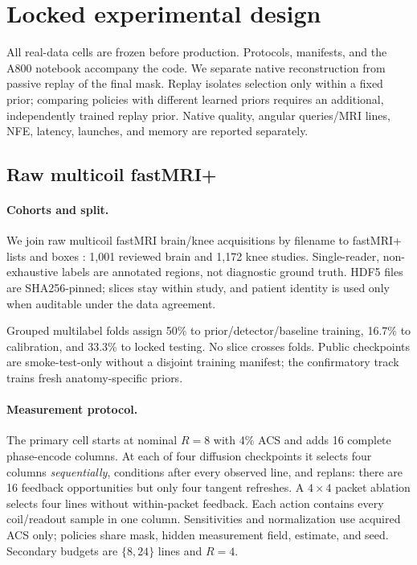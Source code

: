 \section{Locked experimental design}
\label{sec:experiments}

All real-data cells are frozen before production.  Protocols, manifests, and
the A800 notebook accompany the code.  We separate native reconstruction from
passive replay of the final mask.  Replay isolates selection only within a
fixed prior; comparing policies with different learned priors requires an
additional, independently trained replay prior.  Native quality, angular
queries/MRI lines, NFE, latency, launches, and memory are reported separately.

\subsection{Raw multicoil fastMRI+}

\paragraph{Cohorts and split.}
We join raw multicoil fastMRI brain/knee acquisitions
\cite{knoll2020fastmri} by filename to fastMRI+ lists and boxes
\cite{zhao2022fastmriplus}: 1,001 reviewed brain and 1,172 knee studies.
Single-reader, non-exhaustive labels are annotated regions, not diagnostic
ground truth.  HDF5 files are SHA256-pinned; slices stay within study, and
patient identity is used only when auditable under the data agreement.

Grouped multilabel folds assign 50\% to prior/detector/baseline training,
16.7\% to calibration, and 33.3\% to locked testing.  No slice crosses folds.
Public checkpoints are smoke-test-only without a disjoint training manifest;
the confirmatory track trains fresh anatomy-specific priors.

\paragraph{Measurement protocol.}
The primary cell starts at nominal $R=8$ with 4\% ACS and adds 16 complete
phase-encode columns.  At each of four diffusion checkpoints it selects four
columns \emph{sequentially}, conditions after every observed line, and replans:
there are 16 feedback opportunities but only four tangent refreshes.  A
$4\times4$ packet ablation selects four lines without within-packet feedback.
Each action contains every coil/readout sample in one column.  Sensitivities
and normalization use acquired ACS only; policies share mask, hidden
measurement field, estimate, and seed.  Secondary budgets are $\{8,24\}$
lines and $R=4$.

